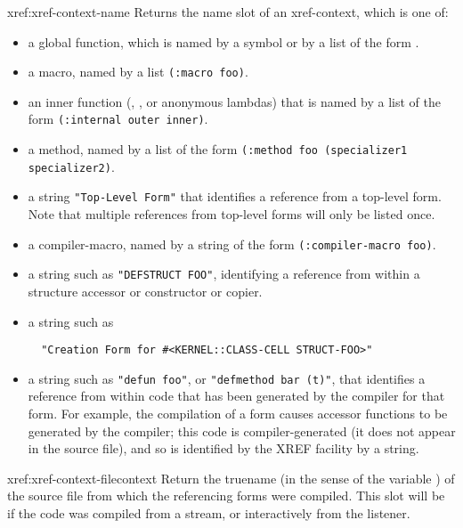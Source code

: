 \begin{defun}{xref:}{xref-context-name}{\args {}}
  Returns the name slot of an xref-context, which is one of:
\begin{itemize}
\item
a global function, which is named by a symbol or by a list of the form
. 

\item
a macro, named by a list \verb|(:macro foo)|.

\item
an inner function (, , or anonymous lambdas) that
is named by a list of the form \verb|(:internal outer inner)|.

\item
a method, named by a list of the form
\verb|(:method foo (specializer1 specializer2)|. 

\item
a string \verb|"Top-Level Form"| that identifies a reference from a
top-level form. Note that multiple references from top-level forms
will only be listed once. 

\item
a compiler-macro, named by a string of the form
\verb|(:compiler-macro foo)|. 

\item
a string such as \verb|"DEFSTRUCT FOO"|, identifying a reference from
within a structure accessor or constructor or copier.

\item
a string such as 
\begin{verbatim}
  "Creation Form for #<KERNEL::CLASS-CELL STRUCT-FOO>"
\end{verbatim}

\item
a string such as \verb|"defun foo"|, or \verb|"defmethod bar (t)"|,
that identifies a reference from within code that has been generated
by the compiler for that form. For example, the compilation of a
 form causes accessor functions to be generated by the
compiler; this code is compiler-generated (it does not appear in the
source file), and so is identified by the XREF facility by a string. 
\end{itemize}
\end{defun}


\begin{defun}{xref:}{xref-context-file}{context}
  Return the truename (in the sense of the variable
   ) of the source file from which the
   referencing forms were compiled. This slot will be \nil{} if the
   code was compiled from a stream, or interactively from the
   listener.
\end{defun}

